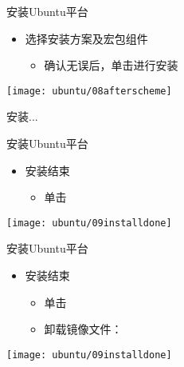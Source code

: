 \documentclass[fontset = none, t]{ctexbeamer}
\begin{document}
\begin{frame}{安装\tl}{Ubuntu平台}
  \begin{spacing}{1.0}
    \begin{itemize}
    \item 选择\tl 安装方案及宏包组件
      \begin{itemize}
      \item 确认无误后，单击进行安装
      \end{itemize}
    \end{itemize}
    \begin{center}
      \begin{annotatedFigure}
        {\texttt{[image: ubuntu/08afterscheme]}}
      \end{annotatedFigure}
    \end{center}
  \end{spacing}
\end{frame}

\begin{frame}
  安装...
\end{frame}

\begin{frame}{安装\tl}{Ubuntu平台}
  \begin{spacing}{1.5}
    \begin{itemize}
    \item 安装结束
      \begin{itemize}
      \item 单击
      \end{itemize}
    \end{itemize}
  \begin{center}
    \texttt{[image: ubuntu/09installdone]}
  \end{center}
  \end{spacing}
\end{frame}

\begin{frame}{安装\tl}{Ubuntu平台}
  \begin{spacing}{1.5}
    \begin{itemize}
    \item 安装结束
      \begin{itemize}
      \item 单击
      \item 卸载镜像文件：
      \end{itemize}
    \end{itemize}
  \begin{center}
    \texttt{[image: ubuntu/09installdone]}
  \end{center}
  \end{spacing}
\end{frame}
\end{document}
